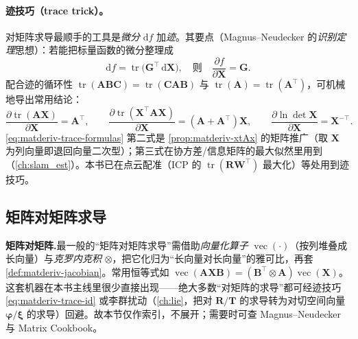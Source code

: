 \paragraph{迹技巧（trace trick）。}
对矩阵求导最顺手的工具是\emph{微分} $\mathrm{d}f$ 加\emph{迹}\cite{magnus2019matrix}。其要点（Magnus--Neudecker 的\emph{识别定理}思想）：若能把标量函数的微分整理成
\begin{equation}
  \mathrm{d}f=\operatorname{tr}\!\big(\mathbf{G}^\top\,\mathrm{d}\mathbf{X}\big),
  \quad\text{则}\quad
  \frac{\partial f}{\partial\mathbf{X}}=\mathbf{G}.
  \label{eq:matderiv-trace-id}
\end{equation}
配合迹的循环性 $\operatorname{tr}(\mathbf{A}\mathbf{B}\mathbf{C})=\operatorname{tr}(\mathbf{C}\mathbf{A}\mathbf{B})$ 与 $\operatorname{tr}(\mathbf{A})=\operatorname{tr}(\mathbf{A}^\top)$，可机械地导出常用结论：
\begin{equation}
  \frac{\partial\operatorname{tr}(\mathbf{A}\mathbf{X})}{\partial\mathbf{X}}=\mathbf{A}^\top,\qquad
  \frac{\partial\operatorname{tr}(\mathbf{X}^\top\mathbf{A}\mathbf{X})}{\partial\mathbf{X}}=(\mathbf{A}+\mathbf{A}^\top)\mathbf{X},\qquad
  \frac{\partial\ln\det\mathbf{X}}{\partial\mathbf{X}}=\mathbf{X}^{-\top}.
  \label{eq:matderiv-trace-formulas}
\end{equation}
\cref{eq:matderiv-trace-formulas} 第二式是 \cref{prop:matderiv-xtAx} 的矩阵推广（取 $\mathbf{X}$ 为列向量即退回向量二次型）；第三式在协方差/信息矩阵的最大似然里用到（\cref{ch:slam_est}）。本书已在点云配准（ICP 的 $\operatorname{tr}(\mathbf{R}\mathbf{W}^\top)$ 最大化）等处用到迹技巧。

\subsection{矩阵对矩阵求导}
\label{sec:matderiv-mat-mat}

\begin{note}
\textbf{矩阵对矩阵.}\;最一般的“矩阵对矩阵求导”需借助\emph{向量化算子} $\operatorname{vec}(\cdot)$（按列堆叠成长向量）与\emph{克罗内克积} $\otimes$，把它化归为“长向量对长向量”的雅可比，再套 \cref{def:matderiv-jacobian}。常用恒等式如 $\operatorname{vec}(\mathbf{A}\mathbf{X}\mathbf{B})=(\mathbf{B}^\top\otimes\mathbf{A})\operatorname{vec}(\mathbf{X})$\cite{magnus2019matrix}。这套机器在本书主线里很少直接出现——绝大多数“对矩阵的求导”都可经迹技巧 \cref{eq:matderiv-trace-id} 或李群扰动（\cref{ch:lie}，把对 $\mathbf{R}/\mathbf{T}$ 的求导转为对切空间向量 $\boldsymbol{\varphi}/\boldsymbol{\xi}$ 的求导）回避。故本节仅作索引，不展开；需要时可查 Magnus--Neudecker\cite{magnus2019matrix} 与 Matrix Cookbook\cite{petersen2012cookbook}。
\end{note}

